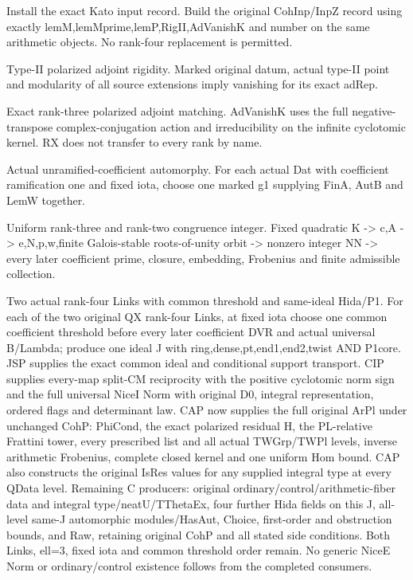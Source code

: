 \begin{description}[style=nextline]
\item[8. TASK\_INP\_Z\_ASSEMBLY --- B] Install the exact Kato input record. Build the original CohInp/InpZ record using exactly lemM,lemMprime,lemP,RigII,AdVanishK and number on the same arithmetic objects. No rank-four replacement is permitted.

\item[9. RIG\_II --- C] Type-II polarized adjoint rigidity. Marked original datum, actual type-II point and modularity of all source extensions imply vanishing for its exact adRep.

\item[10. AD\_VANISH\_K\_MATCH --- D] Exact rank-three polarized adjoint matching. AdVanishK uses the full negative-transpose complex-conjugation action and irreducibility on the infinite cyclotomic kernel. RX does not transfer to every rank by name.

\item[11. AUT\_UNRAM\_COEF --- C] Actual unramified-coefficient automorphy. For each actual Dat with coefficient ramification one and fixed iota, choose one marked g1 supplying FinA, AutB and LemW together.

\item[12. CNR3 --- C] Uniform rank-three and rank-two congruence integer. Fixed quadratic K -> c,A -> e,N,p,w,finite Galois-stable roots-of-unity orbit -> nonzero integer NN -> every later coefficient prime, closure, embedding, Frobenius and finite admissible collection.

\item[13. COUNT\_II\_SUPPORT --- C] Two actual rank-four Links with common threshold and same-ideal Hida/P1. For each of the two original QX rank-four Links, at fixed iota choose one common coefficient threshold before every later coefficient DVR and actual universal B/Lambda; produce one ideal J with ring,dense,pt,end1,end2,twist AND P1core. JSP supplies the exact common ideal and conditional support transport. CIP supplies every-map split-CM reciprocity with the positive cyclotomic norm sign and the full universal NiceI Norm with original D0, integral representation, ordered flags and determinant law. CAP now supplies the full original ArPl under unchanged CohP: PhiCond, the exact polarized residual H, the PL-relative Frattini tower, every prescribed list and all actual TWGrp/TWPl levels, inverse arithmetic Frobenius, complete closed kernel and one uniform Hom bound. CAP also constructs the original IsRes values for any supplied integral type at every QData level. Remaining C producers: original ordinary/control/arithmetic-fiber data and integral type/neatU/TThetaEx, four further Hida fields on this J, all-level same-J automorphic modules/HasAut, Choice, first-order and obstruction bounds, and Raw, retaining original CohP and all stated side conditions. Both Links, ell=3, fixed iota and common threshold order remain. No generic NiceE Norm or ordinary/control existence follows from the completed consumers.


\end{description}
